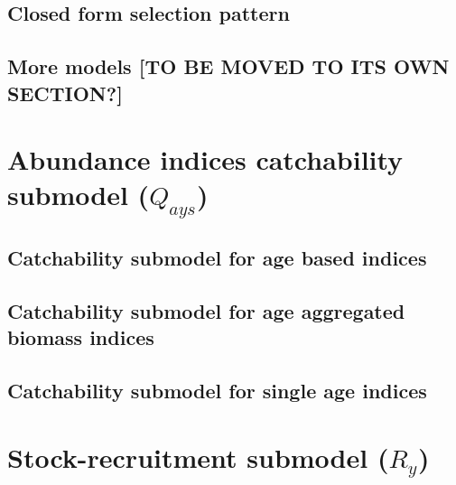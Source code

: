 \documentclass[
]{book}
\begin{document}
\hypertarget{closed-form-selection-pattern}{%
\subsection{Closed form selection pattern}\label{closed-form-selection-pattern}}

\hypertarget{more-models-to-be-moved-to-its-own-section}{%
\subsection{More models {[}TO BE MOVED TO ITS OWN SECTION?{]}}\label{more-models-to-be-moved-to-its-own-section}}

\hypertarget{abundance-indices-catchability-submodel-q_ays}{%
\section{\texorpdfstring{Abundance indices catchability submodel (\(Q_{ays}\))}{Abundance indices catchability submodel (Q\_\{ays\})}}\label{abundance-indices-catchability-submodel-q_ays}}

\hypertarget{catchability-submodel-for-age-based-indices}{%
\subsection{Catchability submodel for age based indices}\label{catchability-submodel-for-age-based-indices}}

\hypertarget{catchability-submodel-for-age-aggregated-biomass-indices}{%
\subsection{Catchability submodel for age aggregated biomass indices}\label{catchability-submodel-for-age-aggregated-biomass-indices}}

\hypertarget{catchability-submodel-for-single-age-indices}{%
\subsection{Catchability submodel for single age indices}\label{catchability-submodel-for-single-age-indices}}

\hypertarget{stock-recruitment-submodel-r_y}{%
\section{\texorpdfstring{Stock-recruitment submodel (\(R_y\))}{Stock-recruitment submodel (R\_y)}}\label{stock-recruitment-submodel-r_y}}
\end{document}
